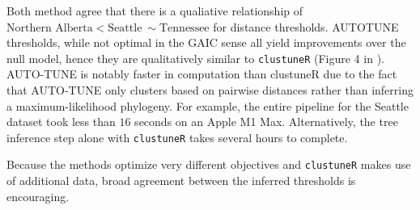 \documentclass[utf8]{FrontiersinHarvard} %
\begin{document}
Both method agree that there is a qualiative relationship of $\text{Northern Alberta} < \text{Seattle} ~\sim \text{Tennessee}$ for distance thresholds.
AUTOTUNE thresholds, while not optimal in the GAIC sense all yield improvements over the null model, hence they are qualitatively similar to {\tt clustuneR}  (Figure 4 in \cite{chato_public_2020}).  AUTO-TUNE is notably faster in computation than
clustuneR due to the fact that AUTO-TUNE only clusters based on pairwise
distances rather than inferring a maximum-likelihood phylogeny. For example, the
entire pipeline for the Seattle dataset took less than $16$ seconds on an Apple M1
Max. Alternatively, the tree inference step alone with {\tt clustuneR} takes several
hours to complete.

Because the methods optimize very different objectives and {\tt clustuneR} makes use of additional data, broad agreement between the inferred thresholds is encouraging.


\end{document}
